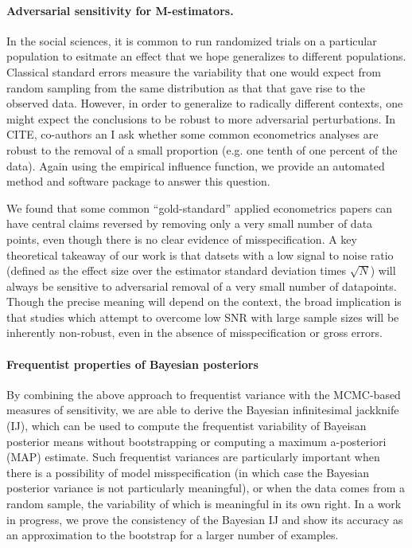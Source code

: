 \paragraph{Adversarial sensitivity for M-estimators.}


\citet{angelucci:2009:indirect}
\citep{finkelstein:2012:oregon}

In the social sciences, it is common to run randomized trials on a particular
population to esitmate an effect that we hope generalizes to different
populations.  Classical standard errors measure the variability that one
would expect from random sampling from the same distribution as that that
gave rise to the observed data.  However, in order to generalize to radically
different contexts, one might expect the conclusions to be robust to more
adversarial perturbations.  In CITE, co-authors an I ask whether some
common econometrics analyses are robust to the removal of a small proportion
(e.g. one tenth of one percent of the data).  Again using the empirical
influence function, we provide an automated method and software package
to answer this question.

We found that some common ``gold-standard'' applied econometrics papers
can have central claims reversed by removing only a very small number of
data points, even though there is no clear evidence of misspecification.
A key theoretical takeaway of our work is that datsets with a low signal
to noise ratio (defined as the effect size over the estimator standard
deviation times $\sqrt{N}$) will always be sensitive to adversarial removal
of a very small number of datapoints.  Though the precise meaning will
depend on the context, the broad implication is that studies which
attempt to overcome low SNR with large sample sizes will be inherently
non-robust, even in the absence of misspecification or gross errors.


\paragraph{Frequentist properties of Bayesian posteriors}

By combining the above approach to frequentist variance with the MCMC-based
measures of sensitivity, we are able to derive the Bayesian infinitesimal
jackknife (IJ), which can be used to compute the frequentist variability
of Bayeisan posterior means without bootstrapping or computing a maximum
a-posteriori (MAP) estimate.  Such frequentist variances are particularly
important when there is a possibility of model misspecification (in which
case the Bayesian posterior variance is not particularly meaningful),
or when the data comes from a random sample, the variability of which
is meaningful in its own right.  In a work in progress, we prove the consistency
of the Bayesian IJ and show its accuracy as an approximation to the bootstrap
for a larger number of examples.
\citet{huggins:2019:bayesbag}
\citet{waddell:2002:bayesphyloboot}
\citet{kleijn:2006:misspecification}
\citet{kass:1990:posteriorexpansions} %
\citet[Chapter 6]{lehman:1983:pointestimation}


